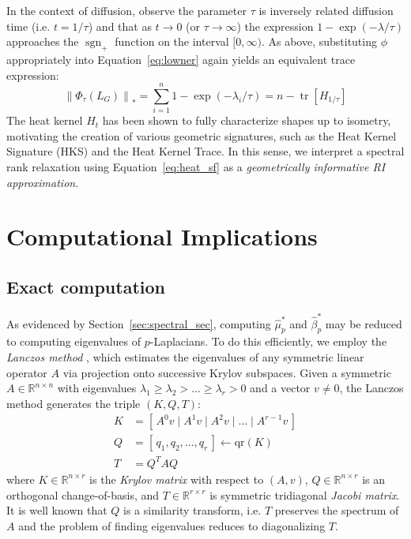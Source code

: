 \documentclass[pdflatex,sn-mathphys-num]{sn-jnl}
\begin{document}
In the context of diffusion, observe the parameter \(\tau\) is inversely related diffusion time (i.e. \(t = 1/\tau\)) and that as \(t \rightarrow 0\) (or \(\tau \rightarrow \infty\)) the expression \(1 - \exp( - \lambda/\tau)\) approaches the \(\operatorname{sgn}_{+}\) function on the interval \([ 0,\infty)\). As above, substituting \(\phi\) appropriately into Equation~\ref{eq:lowner} again yields an equivalent trace expression:
\[\label{eq:heat_trace}
\left\| {\Phi_{\tau}\left( L_{G} \right)} \right\|_{\ast} = \sum_{i = 1}^{n}1 - \exp\left( - \lambda_{i}/\tau \right) = n - \operatorname{tr} \left[ H_{1/\tau} \right]
\]
The heat kernel \(H_{t}\) has been shown to fully characterize shapes up to isometry, motivating the creation of various geometric signatures, such as the Heat Kernel Signature (HKS) and the Heat Kernel Trace. In this sense, we interpret a spectral rank relaxation using Equation~\ref{eq:heat_sf} as a \emph{geometrically informative RI approximation}.


\section{Computational Implications}\label{sec:computational_imp}
\subsection{Exact computation}\label{sec:lanczos_it}
As evidenced by Section~\ref{sec:spectral_sec}, computing \({\hat{\mu}}_{p}^{\ast}\) and \({\hat{\beta}}_{p}^{\ast}\) may be reduced to computing eigenvalues of \(p\)-Laplacians. To do this efficiently, we employ the \emph{Lanczos method} \cite{lanczos1950iteration}, which estimates the eigenvalues of any symmetric linear operator \(A\) via projection onto successive Krylov subspaces. Given a symmetric \(A \in \mathbb{R}^{n \times n}\) with eigenvalues \(\lambda_{1} \geq \lambda_{2} > \ldots \geq \lambda_{r} > 0\) and a vector \(v \neq 0\), the Lanczos method generates the triple \((K,Q,T)\):
\[
\begin{aligned}
K & = \left. \left\lbrack \, A^{0}v \mid A^{1}v \mid A^{2}v \mid \ldots \mid A^{r - 1}v\, \right\rbrack \right. \\
Q & = \left. \left\lbrack \, q_{1},q_{2},\ldots,q_{r}\, \right\rbrack \right. \leftarrow \mathrm{qr}(K) \\
T & = Q^{T}AQ
\end{aligned}
\]
\noindent where \(K \in \mathbb{R}^{n \times r}\) is the \emph{Krylov matrix} with respect to \((A,v)\), \(Q \in \mathbb{R}^{n \times r}\) is an orthogonal change-of-basis, and \(T \in \mathbb{R}^{r \times r}\) is symmetric tridiagonal \emph{Jacobi matrix}. It is well known that \(Q\) is a similarity transform, i.e. \(T\) preserves the spectrum of \(A\) and the problem of finding eigenvalues reduces to diagonalizing \(T\).
\end{document}

